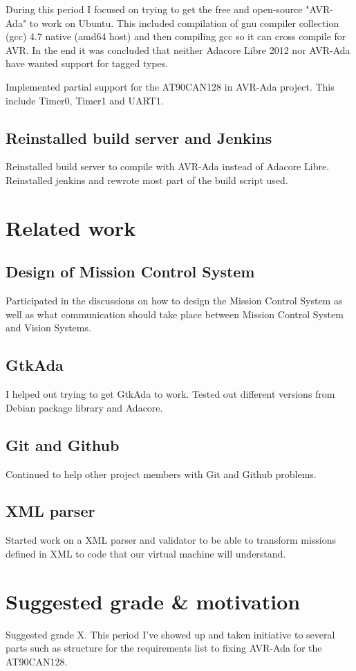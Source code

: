 During this period I focused on trying to get the free and open-source
"AVR-Ada" to work on Ubuntu. This included compilation of gnu compiler
collection (gcc) 4.7 native (amd64 host) and then compiling gcc so it can cross
compile for AVR. In the end it was concluded that neither Adacore Libre 2012
nor AVR-Ada have wanted support for tagged types.

Implemented partial support for the AT90CAN128 in AVR-Ada project. This include
Timer0, Timer1 and UART1. \cite{web:sf_avr_ada}

\subsection{Reinstalled build server and Jenkins}
Reinstalled build server to compile with AVR-Ada instead of Adacore Libre.
Reinstalled jenkins and rewrote most part of the build script used.

\section{Related work}

\subsection{Design of Mission Control System}
Participated in the discussions on how to design the Mission Control System as
well as what communication should take place between Mission Control System and
Vision Systems.

\subsection{GtkAda}
I helped out trying to get GtkAda to work. Tested out different versions from
Debian package library and Adacore.

\subsection{Git and Github}
Continued to help other project members with Git and Github problems.

\subsection{XML parser}
Started work on a XML parser and validator to be able to transform missions
defined in XML to code that our virtual machine will understand.

\section{Suggested grade \& motivation}
Suggested grade X. This period I've showed up and taken initiative to several
parts such as structure for the requirements list to fixing AVR-Ada for the
AT90CAN128.
